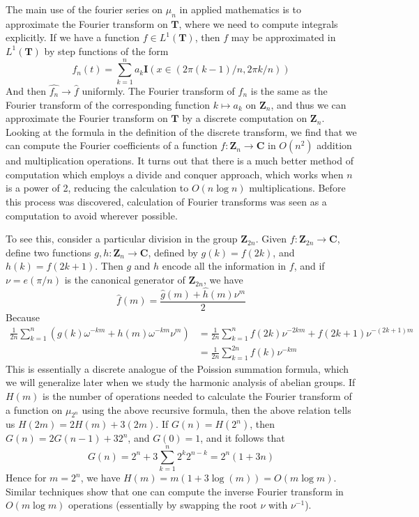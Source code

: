 The main use of the fourier series on $\mu_n$ in applied mathematics is to approximate the Fourier transform on $\mathbf{T}$, where we need to compute integrals explicitly. If we have a function $f \in L^1(\mathbf{T})$, then $f$ may be approximated in $L^1(\mathbf{T})$ by step functions of the form
%
\[ f_n(t) = \sum_{k = 1}^{n} a_k \mathbf{I}(x \in (2 \pi (k-1) / n, 2 \pi k / n)) \]
%
And then $\widehat{f_n} \to \widehat{f}$ uniformly. The Fourier transform of $f_n$ is the same as the Fourier transform of the corresponding function $k \mapsto a_k$ on $\mathbf{Z}_n$, and thus we can approximate the Fourier transform on $\mathbf{T}$ by a discrete computation on $\mathbf{Z}_n$. Looking at the formula in the definition of the discrete transform, we find that we can compute the Fourier coefficients of a function $f: \mathbf{Z}_n \to \mathbf{C}$ in $O(n^2)$ addition and multiplication operations. It turns out that there is a much better method of computation which employs a divide and conquer approach, which works when $n$ is a power of 2, reducing the calculation to $O(n \log n)$ multiplications. Before this process was discovered, calculation of Fourier transforms was seen as a computation to avoid wherever possible.

To see this, consider a particular division in the group $\mathbf{Z}_{2n}$. Given $f: \mathbf{Z}_{2n} \to \mathbf{C}$, define two functions $g,h: \mathbf{Z}_n \to \mathbf{C}$, defined by $g(k) = f(2k)$, and $h(k) = f(2k + 1)$. Then $g$ and $h$ encode all the information in $f$, and if $\nu = e(\pi/n)$ is the canonical generator of $\mathbf{Z}_{2n}$, we have
%
\[ \hat{f}(m) = \frac{\hat{g}(m) + \hat{h}(m) \nu^m}{2} \]
%
Because
%
\begin{align*}
    \frac{1}{2n} \sum_{k = 1}^{n} \left( g(k) \omega^{-km} + h(m) \omega^{-km} \nu^m \right) &= \frac{1}{2n} \sum_{k = 1}^n f(2k) \nu^{-2km} + f(2k + 1) \nu^{-(2k+1)m}\\
    &= \frac{1}{2n} \sum_{k = 1}^{2n} f(k) \nu^{-km}
\end{align*}
%
This is essentially a discrete analogue of the Poission summation formula, which we will generalize later when we study the harmonic analysis of abelian groups. If $H(m)$ is the number of operations needed to calculate the Fourier transform of a function on $\mu_{2^n}$ using the above recursive formula, then the above relation tells us $H(2m) = 2H(m) + 3 (2m)$. If $G(n) = H(2^n)$, then $G(n) = 2G(n-1) + 3 2^n$, and $G(0) = 1$, and it follows that
%
\[ G(n) = 2^n + 3 \sum_{k = 1}^n 2^{k} 2^{n-k} = 2^n(1 + 3n) \]
%
Hence for $m = 2^n$, we have $H(m) = m(1 + 3 \log (m)) = O(m \log m)$. Similar techniques show that one can compute the inverse Fourier transform in $O(m \log m)$ operations (essentially by swapping the root $\nu$ with $\nu^{-1}$).

